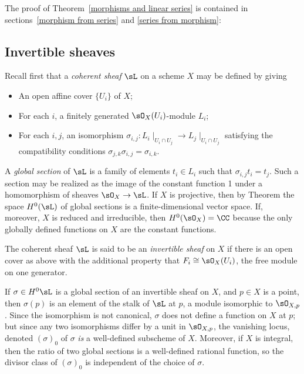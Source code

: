 The proof of Theorem~\ref{morphisms and linear series} is contained in sections~\ref{morphism from series}
and \ref{series from morphism}:


\subsection{Invertible sheaves}\label{Invertible sheaves}

Recall first that a \emph{coherent sheaf} $\sL$ on a scheme $X$ may be defined by
giving 
\begin{itemize}
 \item An open affine cover $\{U_{i}\}$ of $X$; 
 \item For each $i$, a finitely generated $\sO_{X}(U_{i})$-module $L_{i}$;
 \item For each $i,j$, an isomorphism $\sigma_{i,j}: L_{i}\mid_{U_{i}\cap U_{j}} \to L_{j}\mid_{U_{i}\cap U_{j}}$
 satisfying the compatibility conditions $\sigma_{j,k}\sigma_{i,j} = \sigma_{i,k}$. 
 \end{itemize}

A \emph{global section} of $\sL$ is a family of elements $t_{i}\in L_{i}$ such that 
$\sigma_{i,j} t_{i} = t_{j}$. Such a section may be realized as the image of the constant function 1 under
a homomorphism of sheaves $\sO_{X} \to \sL$. If $X$ is projective, then 
by Theorem \cite[Thm III.5.2]{H} the space $H^{0}(\sL)$  of global sections is
a finite-dimensional vector space. If, moreover, $X$ is reduced and irreducible, then $H^{0}(\sO_{X}) = \CC$ because the only globally defined
functions on $X$ are the constant functions.

The coherent sheaf $\sL$ is said to be an \emph{invertible sheaf} on $X$ if there is an open cover as above with the additional property
that $F_{i} \cong \sO_X(U_{i})$, the free module on one generator. 

If $\sigma \in H^0\sL$ is a global section of an invertible sheaf
on $X$, and $p\in X$ is a point, then $\sigma(p)$ is an element of the stalk of $\sL$ at $p$, a module isomorphic to $\sO_{X,p}$. Since the isomorphism is not canonical, $\sigma$ does not define a function on $X$ at $p$; but since any two isomorphisms
differ by a unit in $\sO_{X,p}$, the vanishing locus, denoted $(\sigma)_0$ of $\sigma$ \emph{is} a well-defined subscheme of $X$. Moreover, if $X$ is integral, then the ratio of two global sections is a well-defined rational function, so the divisor class of 
$(\sigma)_0$ is independent of the choice of $\sigma$.

